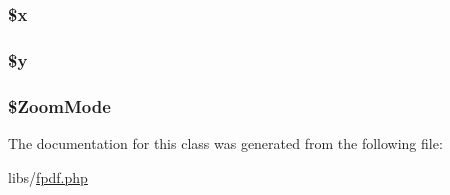 \subsubsection[{\$x}]{\setlength{\rightskip}{0pt plus 5cm}\$x}\label{class_f_p_d_f_af3a16c5f0dd7a74cf9acf6a49fff73a7}
\hypertarget{class_f_p_d_f_a77b973d137fb33212e018b042df6e3e7}{}
\subsubsection[{\$y}]{\setlength{\rightskip}{0pt plus 5cm}\$y}\label{class_f_p_d_f_a77b973d137fb33212e018b042df6e3e7}
\hypertarget{class_f_p_d_f_aef0c9d2afc8e2f1a4788c1575b304334}{}
\subsubsection[{\$\+Zoom\+Mode}]{\setlength{\rightskip}{0pt plus 5cm}\$Zoom\+Mode}\label{class_f_p_d_f_aef0c9d2afc8e2f1a4788c1575b304334}


The documentation for this class was generated from the following file\+:\begin{DoxyCompactItemize}
\item 
libs/\hyperlink{fpdf_8php}{fpdf.\+php}\end{DoxyCompactItemize}
